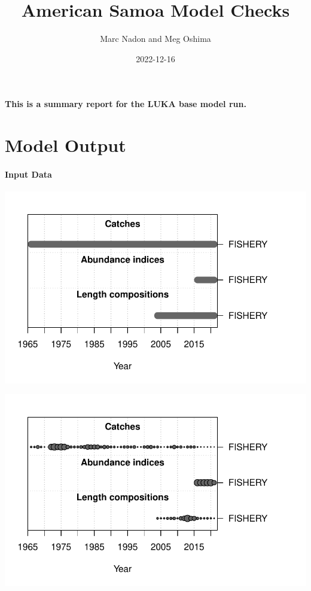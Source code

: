 \documentclass[
  letterpaper,
  DIV=11,
  numbers=noendperiod]{scrartcl}
\title{American Samoa Model Checks}
\author{Marc Nadon and Meg Oshima}
\date{2022-12-16}
\let\oldparagraph\paragraph
\renewcommand{\paragraph}[1]{\oldparagraph{#1}\mbox{}}
\begin{document}
\maketitle
\ifdefined\Shaded\renewenvironment{Shaded}{\begin{tcolorbox}[enhanced, frame hidden, breakable, sharp corners, boxrule=0pt, interior hidden, borderline west={3pt}{0pt}{shadecolor}]}{\end{tcolorbox}}\fi

\textbf{This is a summary report for the LUKA base model run.}

\hypertarget{model-output}{%
\section{Model Output}\label{model-output}}

\hypertarget{input-data}{%
\paragraph{Input Data}\label{input-data}}

\includegraphics{LUKA_50_Base_model_diags_report_files/figure-pdf/dataplot-1.pdf}

\includegraphics{LUKA_50_Base_model_diags_report_files/figure-pdf/dataplot-2.pdf}
\end{document}
